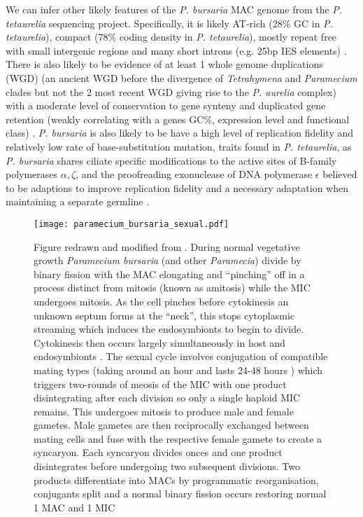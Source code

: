 We can infer other likely features of the \textit{P. bursaria} MAC genome from the \textit{P. tetaurelia} sequencing project.
Specifically, it is likely AT-rich (28\% GC in \textit{P. tetaurelia}), compact (78\% coding density in \textit{P. tetaurelia}),
mostly repeat free with small intergenic regions and many short introns (e.g. 25bp IES elements) \citep{Aury2006}.  
There is also likely to be evidence of at least 1 whole genome duplications (WGD) (an ancient WGD before the divergence of 
\textit{Tetrahymena} and \textit{Paramecium} clades but not the 2 most recent WGD giving rise to the \textit{P. aurelia} complex) with a moderate 
level of conservation to gene synteny and duplicated gene retention 
(weakly correlating with a genes GC\%, expression level and functional class) \citep{Aury2006,McGrath2014}.
\textit{P. bursaria} is also likely to be have a high level of replication fidelity and relatively low rate of base-substitution mutation,
traits found in \textit{P. tetaurelia}, as \textit{P. bursaria} shares ciliate specific modifications to the active sites
of B-family polymerases \(\alpha, \zeta\), and the proofreading exonuclease of DNA polymerase \(\epsilon\) believed to be adaptions to
improve replication fidelity and a necessary adaptation when maintaining a separate germline \citep{Sung2012}.

\begin{figure}[h!]
    \caption{
        Figure redrawn and modified from \citep{Duret2008}.
        During normal vegetative growth \textit{Paramecium bursaria} (and other \textit{Paramecia}) divide by binary fission with the MAC
        elongating and ``pinching'' off in a process distinct from mitosis (known as amitosis) while the MIC undergoes mitosis.
        As the cell pinches before cytokinesis an unknown septum forms at the ``neck'', this stops cytoplasmic streaming which induces
        the endosymbionts to begin to divide. Cytokinesis then occurs largely simultaneously in host and endosymbionts \citep{Kadono2004,Takahashi2007}.
        The sexual cycle involves conjugation of compatible mating types (taking around an hour and lasts 24-48 hours \citep{Jennings1939}) 
        which triggers two-rounds of meosis of the MIC with
        one product disintegrating after each division so only a single haploid MIC remains. This undergoes mitosis to produce male and
        female gametes. Male gametes are then reciprocally exchanged between mating cells and fuse with the respective female gamete to 
        create a syncaryon. Each syncaryon divides onces and one product disintegrates before undergoing two subsequent divisions.
        Two products differentiate into MACs by programmatic reorganisation, conjugants split and a normal binary fission occurs 
    restoring normal 1 MAC and 1 MIC \citep{Siegel1963} }%
    \texttt{[image: paramecium\_bursaria\_sexual.pdf]}
    \label{fig:pb_sex} 
\end{figure}

